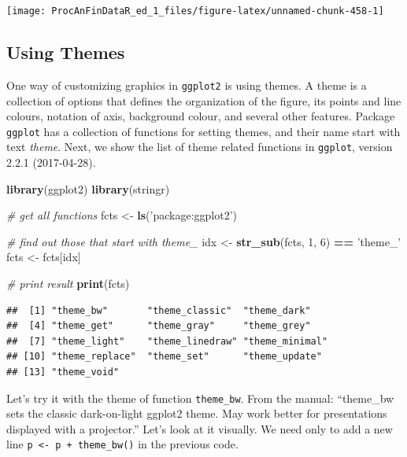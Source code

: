 \documentclass[11pt,]{book}
\newenvironment{Shaded}{\begin{snugshade}}{\end{snugshade}}
\newcommand{\KeywordTok}[1]{\textcolor[rgb]{0.27,0.27,0.27}{\textbf{#1}}}
\newcommand{\DecValTok}[1]{\textcolor[rgb]{0.06,0.06,0.06}{#1}}
\newcommand{\StringTok}[1]{\textcolor[rgb]{0.5,0.5,0.5}{#1}}
\newcommand{\CommentTok}[1]{\textcolor[rgb]{0.56,0.35,0.01}{\textit{#1}}}
\newcommand{\OperatorTok}[1]{\textcolor[rgb]{0.81,0.36,0.00}{\textbf{#1}}}
\newcommand{\NormalTok}[1]{#1}
\begin{document}
\begin{center}\texttt{[image: ProcAnFinDataR\_ed\_1\_files/figure-latex/unnamed-chunk-458-1]} \end{center}

\subsection{Using Themes}\label{using-themes}

One way of customizing graphics in \texttt{ggplot2} is using themes. A
theme is a collection of options that defines the organization of the
figure, its points and line colours, notation of axis, background
colour, and several other features. Package \texttt{ggplot} has a
collection of functions for setting themes, and their name start with
text \emph{theme}. Next, we show the list of theme related functions in
\texttt{ggplot}, version 2.2.1 (2017-04-28).

\begin{Shaded}
\begin{Highlighting}[]
\KeywordTok{library}\NormalTok{(ggplot2)}
\KeywordTok{library}\NormalTok{(stringr)}

\CommentTok{# get all functions}
\NormalTok{fcts <-}\StringTok{ }\KeywordTok{ls}\NormalTok{(}\StringTok{'package:ggplot2'}\NormalTok{)}

\CommentTok{# find out those that start with theme_}
\NormalTok{idx <-}\StringTok{ }\KeywordTok{str_sub}\NormalTok{(fcts, }\DecValTok{1}\NormalTok{, }\DecValTok{6}\NormalTok{) }\OperatorTok{==}\StringTok{ 'theme_'}
\NormalTok{fcts <-}\StringTok{ }\NormalTok{fcts[idx]}

\CommentTok{# print result}
\KeywordTok{print}\NormalTok{(fcts)}
\end{Highlighting}
\end{Shaded}

\begin{verbatim}
##  [1] "theme_bw"       "theme_classic"  "theme_dark"    
##  [4] "theme_get"      "theme_gray"     "theme_grey"    
##  [7] "theme_light"    "theme_linedraw" "theme_minimal" 
## [10] "theme_replace"  "theme_set"      "theme_update"  
## [13] "theme_void"
\end{verbatim}

Let's try it with the theme of function \texttt{theme\_bw}. From the
manual: ``theme\_bw sets the classic dark-on-light ggplot2 theme. May
work better for presentations displayed with a projector.'' Let's look
at it visually. We need only to add a new line
\texttt{p\ \textless{}-\ p\ +\ theme\_bw()} in the previous code.
\end{document}
